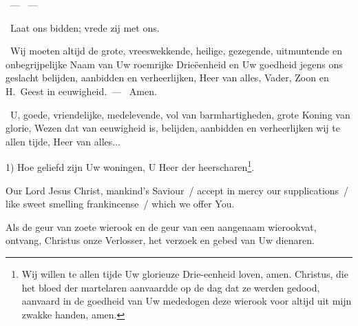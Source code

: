\documentclass[12pt,twoside,a5paper]{article}
\begin{document}
\begin{halfparskip}
\end{halfparskip}

\begin{halfparskip}

  ~--- ~--- 
\end{halfparskip}

\begin{halfparskip}
  \dd~Laat ons bidden; vrede zij met ons.

   \cc~Wij moeten altijd de grote, vreeswekkende, heilige, gezegende, uitmuntende en onbegrijpelijke Naam van Uw roemrijke Drieëenheid en Uw goedheid jegens ons geslacht belijden, aanbidden
  en verheerlijken, Heer van alles, Vader, Zoon en H.~Geest in eeuwigheid.~--- \rr~Amen.

   \cc~U, goede, vriendelijke, medelevende, vol van barmhartigheden, grote Koning van glorie, Wezen dat van eeuwigheid is, belijden, aanbidden en verheerlijken wij te allen tijde, Heer van alles...
\end{halfparskip}



\begin{halfparskip}
   1) Hoe geliefd zijn Uw woningen, U Heer der heerscharen\footnote{ Wij willen te allen tijde Uw glorieuze Drie-eenheid loven, amen.  Christus, die het bloed der martelaren aanvaardde op de dag dat ze werden gedood, aanvaard in de goedheid van Uw mededogen deze wierook voor altijd uit mijn zwakke handen, amen.}.

\end{halfparskip}

\begin{doublecols}
  \englishl Our Lord Jesus Christ, mankind's Saviour~/ accept in mercy our supplications~/ like sweet smelling frankincense~/ which we offer You.

   Als de geur van zoete wierook en de geur van een aangenaam wierookvat, ontvang, Christus onze Verlosser, het verzoek en gebed van Uw dienaren.
\end{doublecols}
\end{document}
